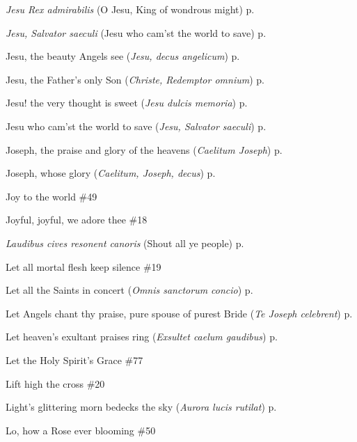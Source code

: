 \begin{hangparas}{1.25em}{1}
\par\noindent
\textit{Jesu Rex admirabilis} (O Jesu, King of wondrous might) \dotfill p. \pageref{HolyNameInvitatory}
\par\noindent
\textit{Jesu, Salvator saeculi} (Jesu who cam'st the world to save) \dotfill p. \pageref{AllHallowsMattins}
\par\noindent
Jesu, the beauty Angels see (\textit{Jesu, decus angelicum}) \dotfill p. \pageref{HolyNameMattins}
\par\noindent
Jesu, the Father's only Son (\textit{Christe, Redemptor omnium}) \dotfill p. \pageref{ChristmasEvensong}
\par\noindent
Jesu! the very thought is sweet (\textit{Jesu dulcis memoria}) \dotfill p. \pageref{HolyNameEvensong}
\par\noindent
Jesu who cam'st the world to save (\textit{Jesu, Salvator saeculi}) \dotfill p. \pageref{AllHallowsMattins}
\par\noindent
Joseph, the praise and glory of the heavens (\textit{Caelitum Joseph}) \dotfill p. \pageref{PatronageMattins}
\par\noindent
Joseph, whose glory (\textit{Caelitum, Joseph, decus}) \dotfill p. \pageref{JosephInvitatory}
\par\noindent
Joy to the world \dotfill \#49
\par\noindent
Joyful, joyful, we adore thee \dotfill \#18
\par\noindent
\textit{Laudibus cives resonent canoris} (Shout all ye people) \dotfill p. \pageref{BenedictEvensong}
\par\noindent
Let all mortal flesh keep silence \dotfill \#19
\par\noindent
Let all the Saints in concert (\textit{Omnis sanctorum concio}) \dotfill p. \pageref{AnneEvensongII}
\par\noindent
Let Angels chant thy praise, pure spouse of purest Bride (\textit{Te Joseph celebrent}) \dotfill p. \pageref{PatronageEvensong}
\par\noindent
Let heaven's exultant praises ring (\textit{Exsultet caelum gaudibus}) \dotfill p. \pageref{JohnMattins}
\par\noindent
Let the Holy Spirit's Grace \dotfill \#77
\par\noindent
Lift high the cross \dotfill \#20
\par\noindent
Light's glittering morn bedecks the sky (\textit{Aurora lucis rutilat}) \dotfill p. \pageref{EasterMattins}
\par\noindent
Lo, how a Rose ever blooming \dotfill \#50

\end{hangparas}
